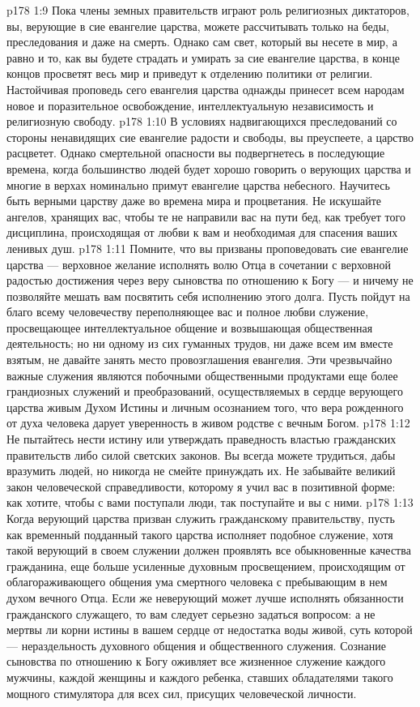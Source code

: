 \vs p178 1:9 Пока члены земных правительств играют роль религиозных диктаторов, вы, верующие в сие евангелие царства, можете рассчитывать только на беды, преследования и даже на смерть. Однако сам свет, который вы несете в мир, а равно и то, как вы будете страдать и умирать за сие евангелие царства, в конце концов просветят весь мир и приведут к отделению политики от религии. Настойчивая проповедь сего евангелия царства однажды принесет всем народам новое и поразительное освобождение, интеллектуальную независимость и религиозную свободу.
\vs p178 1:10 В условиях надвигающихся преследований со стороны ненавидящих сие евангелие радости и свободы, вы преуспеете, а царство расцветет. Однако смертельной опасности вы подвергнетесь в последующие времена, когда большинство людей будет хорошо говорить о верующих царства и многие в верхах номинально примут евангелие царства небесного. Научитесь быть верными царству даже во времена мира и процветания. Не искушайте ангелов, хранящих вас, чтобы те не направили вас на пути бед, как требует того дисциплина, происходящая от любви к вам и необходимая для спасения ваших ленивых душ.
\vs p178 1:11 Помните, что вы призваны проповедовать сие евангелие царства --- верховное желание исполнять волю Отца в сочетании с верховной радостью достижения через веру сыновства по отношению к Богу --- и ничему не позволяйте мешать вам посвятить себя исполнению этого долга. Пусть пойдут на благо всему человечеству переполняющее вас и полное любви служение, просвещающее интеллектуальное общение и возвышающая общественная деятельность; но ни одному из сих гуманных трудов, ни даже всем им вместе взятым, не давайте занять место провозглашения евангелия. Эти чрезвычайно важные служения являются побочными общественными продуктами еще более грандиозных служений и преобразований, осуществляемых в сердце верующего царства живым Духом Истины и личным осознанием того, что вера рожденного от духа человека дарует уверенность в живом родстве с вечным Богом.
\vs p178 1:12 Не пытайтесь нести истину или утверждать праведность властью гражданских правительств либо силой светских законов. Вы всегда можете трудиться, дабы вразумить людей, но никогда не смейте принуждать их. Не забывайте великий закон человеческой справедливости, которому я учил вас в позитивной форме: как хотите, чтобы с вами поступали люди, так поступайте и вы с ними.
\vs p178 1:13 Когда верующий царства призван служить гражданскому правительству, пусть как временный подданный такого царства исполняет подобное служение, хотя такой верующий в своем служении должен проявлять все обыкновенные качества гражданина, еще больше усиленные духовным просвещением, происходящим от облагораживающего общения ума смертного человека с пребывающим в нем духом вечного Отца. Если же неверующий может лучше исполнять обязанности гражданского служащего, то вам следует серьезно задаться вопросом: а не мертвы ли корни истины в вашем сердце от недостатка воды живой, суть которой --- нераздельность духовного общения и общественного служения. Сознание сыновства по отношению к Богу оживляет все жизненное служение каждого мужчины, каждой женщины и каждого ребенка, ставших обладателями такого мощного стимулятора для всех сил, присущих человеческой личности.
